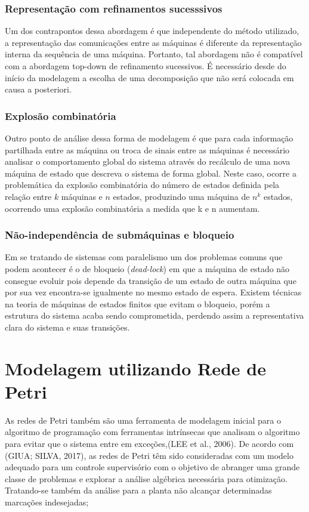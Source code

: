 \subsubsection{Representação com refinamentos sucesssivos}
Um dos contrapontos dessa abordagem é que independente do método utilizado, a representação das comunicações entre as máquinas é diferente da representação interna da sequência de uma máquina. Portanto, tal abordagem não é compatível com a abordagem top-down de refinamento sucessivos. É necessário desde do início da modelagem a escolha de uma decomposição que não será colocada em causa a posteriori. 

\subsubsection{Explosão combinatória}
Outro ponto de análise dessa forma de modelagem é que para cada informação partilhada entre as máquina ou troca de sinais entre as máquinas é necessário analisar o comportamento global do sistema através do recálculo de uma nova máquina de estado que descreva o sistema de forma global. Neste caso, ocorre a problemática da explosão combinatória do número de estados definida pela relação entre $k$ máquinas e $n$ estados, produzindo uma máquina de $n^k $ estados, ocorrendo uma explosão combinatória a medida que k e n aumentam.

\subsubsection{Não-independência de submáquinas e bloqueio}
Em se tratando de sistemas com paralelismo um dos problemas comuns que podem acontecer é o de bloqueio (\textit{dead-lock}) em que a máquina de estado não consegue evoluir pois depende da transição de um estado de outra máquina que por sua vez encontra-se igualmente no mesmo estado de espera. Existem técnicas na teoria de máquinas de estados finitos que evitam o bloqueio, porém a estrutura do sistema acaba sendo comprometida, perdendo assim a representativa clara do sistema e suas transições.

\section{Modelagem utilizando Rede de Petri}
As redes de Petri também são uma ferramenta de modelagem inicial para o algoritmo de programação com ferramentas intrínsecas que analisam o algoritmo para evitar que o sistema entre em exceções,(LEE et al., 2006). 
De acordo com (GIUA; SILVA, 2017), as redes de Petri têm sido consideradas com um modelo adequado para um controle supervisório com o objetivo de abranger uma grande classe de problemas e explorar a análise algébrica necessária para otimização. Tratando-se também da análise para a planta não alcançar determinadas marcações indesejadas;

